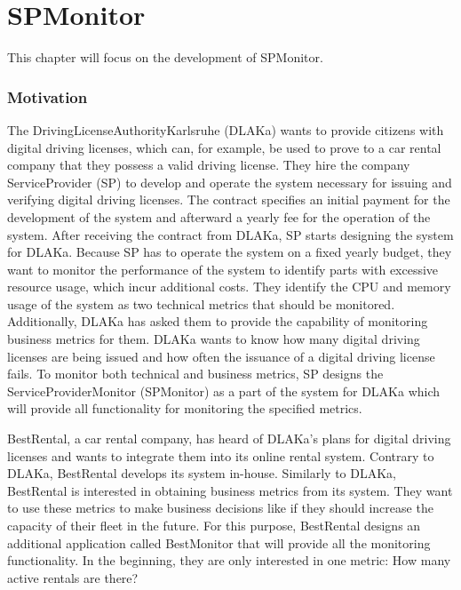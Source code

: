 \chapter{SPMonitor}




This chapter will focus on the development of SPMonitor.

\subsection{Motivation}
The DrivingLicenseAuthorityKarlsruhe (DLAKa) wants to provide citizens with digital driving licenses,
which can, for example, be used to prove to a car rental company that they possess a valid driving license.
They hire the company ServiceProvider (SP) to develop and operate the system necessary for issuing and verifying
digital driving licenses. The contract specifies an initial payment for the development of the system
and afterward a yearly fee for the operation of the system.
After receiving the contract from DLAKa, SP starts designing the system
for DLAKa. Because SP has to operate the system on a fixed yearly budget,
they want to monitor the performance of the system to identify parts with excessive resource usage, which
incur additional costs. They identify the CPU and memory usage of the system as two technical metrics that should be monitored.
Additionally, \Gls{DLAKa} has asked them to provide the capability of monitoring business metrics for them.
\Gls{DLAKa} wants to know how many digital driving licenses are being issued and how often the issuance of a digital
driving license fails. To monitor both technical and business metrics, SP designs the ServiceProviderMonitor (SPMonitor) as a part
of the system for \Gls{DLAKa} which will provide all functionality for monitoring the specified metrics.

BestRental, a car rental company, has heard of DLAKa's plans for digital driving licenses
and wants to integrate them into its online rental system. Contrary to DLAKa, \Gls{BestRental} develops its
system in-house. Similarly to DLAKa, \Gls{BestRental} is interested in obtaining business metrics from its system.
They want to use these metrics to make business decisions like if they should increase the capacity of their fleet in the future.
For this purpose, \Gls{BestRental} designs an additional application called BestMonitor that will provide all the monitoring functionality.
In the beginning, they are only interested in one metric: How many active rentals are there?

